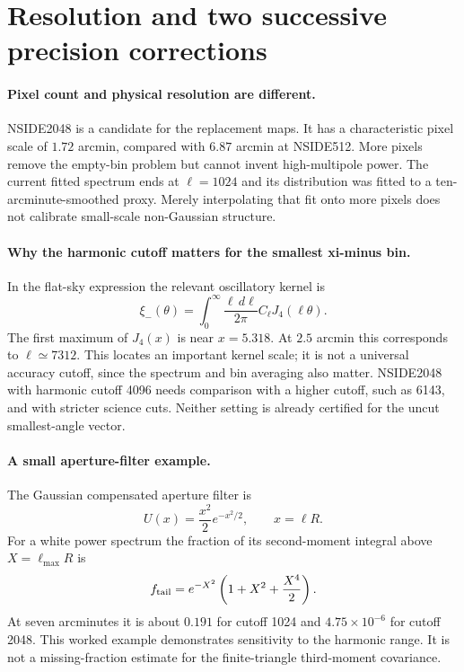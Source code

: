 \documentclass[11pt]{article}
\begin{document}
\section{Resolution and two successive precision corrections}
\paragraph{Pixel count and physical resolution are different.}
NSIDE2048 is a candidate for the replacement maps. It has a characteristic
pixel scale of $1.72$ arcmin, compared with $6.87$ arcmin at NSIDE512.
More pixels remove the empty-bin problem but cannot invent high-multipole
power. The current fitted spectrum ends at $\ell=1024$ and its distribution
was fitted to a ten-arcminute-smoothed proxy. Merely interpolating that fit
onto more pixels does not calibrate small-scale non-Gaussian structure.

\paragraph{Why the harmonic cutoff matters for the smallest xi-minus bin.}
In the flat-sky expression the relevant oscillatory kernel is
\begin{equation}
 \xi_-(\theta)=\int_0^\infty\frac{\ell\,d\ell}{2\pi}
 C_\ell J_4(\ell\theta).
\end{equation}
The first maximum of $J_4(x)$ is near $x=5.318$. At $2.5$ arcmin this
corresponds to $\ell\simeq7312$. This locates an important kernel scale;
it is not a universal accuracy cutoff, since the spectrum and bin averaging
also matter. NSIDE2048 with harmonic cutoff 4096 needs comparison with a
higher cutoff, such as 6143, and with stricter science cuts. Neither setting
is already certified for the uncut smallest-angle vector.

\paragraph{A small aperture-filter example.}
The Gaussian compensated aperture filter is
\begin{equation}
 U(x)=\frac{x^2}{2}e^{-x^2/2},\qquad x=\ell R.
\end{equation}
For a white power spectrum the fraction of its second-moment integral
above $X=\ell_{\max}R$ is
\begin{equation}
 f_{\rm tail}=e^{-X^2}\left(1+X^2+\frac{X^4}{2}\right).
\end{equation}
At seven arcminutes it is about $0.191$ for cutoff 1024 and
$4.75\times10^{-6}$ for cutoff 2048. This worked example demonstrates
sensitivity to the harmonic range. It is not a missing-fraction estimate
for the finite-triangle third-moment covariance.
\end{document}
